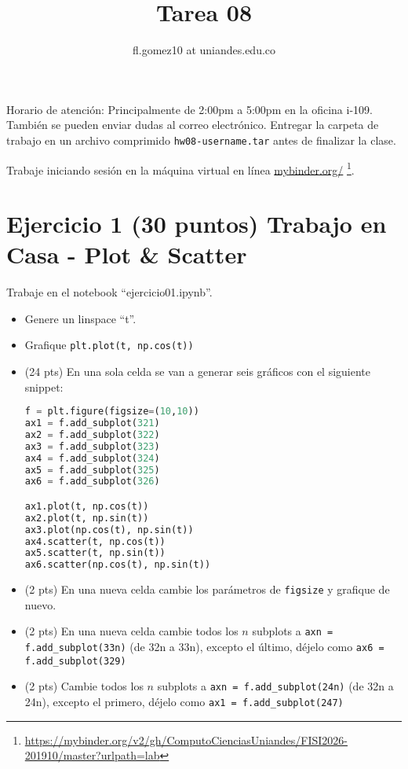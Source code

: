 \documentclass{article}
\title{Tarea 08}
\author{fl.gomez10 at uniandes.edu.co}
\begin{document}
\maketitle

Horario de atención: Principalmente de 2:00pm a 5:00pm en la oficina i-109.
También se pueden enviar dudas al correo electrónico.
Entregar la carpeta de trabajo en un archivo comprimido \texttt{hw08-username.tar}
antes de finalizar la clase. 

Trabaje iniciando  sesión en la máquina virtual en línea
\href{https://mybinder.org/v2/gh/ComputoCienciasUniandes/FISI2026-201910/master?urlpath=lab}{mybinder.org/}
\footnote{\url{https://mybinder.org/v2/gh/ComputoCienciasUniandes/FISI2026-201910/master?urlpath=lab}}. 


\section{Ejercicio 1 (30 puntos) Trabajo en Casa - Plot \& Scatter}

Trabaje en el notebook ``ejercicio01.ipynb''.

\begin{itemize}
\item Genere un linspace ``t''.

\item Grafique \texttt{plt.plot(t, np.cos(t))}
  
\item (24 pts) En una sola celda se van a generar seis gráficos con el siguiente snippet:
\begin{lstlisting}[language=Python]
f = plt.figure(figsize=(10,10))
ax1 = f.add_subplot(321)
ax2 = f.add_subplot(322)
ax3 = f.add_subplot(323)
ax4 = f.add_subplot(324)
ax5 = f.add_subplot(325)
ax6 = f.add_subplot(326)

ax1.plot(t, np.cos(t))
ax2.plot(t, np.sin(t))
ax3.plot(np.cos(t), np.sin(t))
ax4.scatter(t, np.cos(t))
ax5.scatter(t, np.sin(t))
ax6.scatter(np.cos(t), np.sin(t))
\end{lstlisting}
\item (2 pts) En una nueva celda cambie los parámetros de \texttt{figsize} y grafique de nuevo.
\item (2 pts) En una nueva celda cambie todos los $n$ subplots a \texttt{axn = f.add\_subplot(33n)}
  (de 32n a 33n), excepto el último, déjelo como \texttt{ax6 = f.add\_subplot(329)}
\item (2 pts) Cambie todos los $n$ subplots a \texttt{axn = f.add\_subplot(24n)}
(de 32n a 24n), excepto el primero, déjelo como \texttt{ax1 = f.add\_subplot(247)}
\end{itemize}
\end{document}
